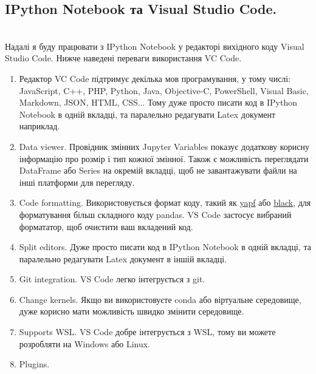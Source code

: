 \documentclass[a4paper,12pt]{article}
\begin{document}
    \subsection{IPython Notebook та Visual Studio Code.}
    \hrulefill \\
    Надалі я буду працювати з IPython Notebook у редакторі вихідного коду Visual Studio Code. Нижче наведені переваги використання VC Code.
    \begin{enumerate}
        \item Редактор VC Code підтримує декілька мов програмування, у тому числі: JavaScript, C++, PHP, Python, Java, Objective-C, PowerShell,
        Visual Basic, Markdown, JSON, HTML, CSS... Тому дуже просто писати код в IPython Notebook в одній вкладці, та паралельно редагувати Latex документ наприклад.
        \item Data viewer. Провідник змінних Jupyter Variables показує додаткову корисну інформацію про розмір і тип кожної змінної. 
        Також є можливість переглядати DataFrame або Series на окремій вкладці, щоб не завантажувати файли на інші платформи для перегляду.
        \item Code formatting. Використовується формат коду, такий як \href{https://github.com/google/yapf}{\underline{yapf}} або 
        \href{https://github.com/psf/black}{\underline{black}}, для форматування більш складного коду pandas. 
        VS Code застосує вибраний формататор, щоб очистити ваш вкладений код.
        \item Split editors. Дуже просто писати код в IPython Notebook в одній вкладці, та паралельно редагувати Latex документ в іншій вкладці.
        \item Git integration. VS Code легко інтегрується з git.
        \item Change kernels. Якщо ви використовуєте conda або віртуальне середовище, дуже корисно мати можливість швидко змінити середовище.
        \item Supports WSL. VS Code добре інтегрується з WSL, тому ви можете розробляти на Windows або Linux.
        \item Plugins. 
    \end{enumerate}

\newpage
\end{document}
